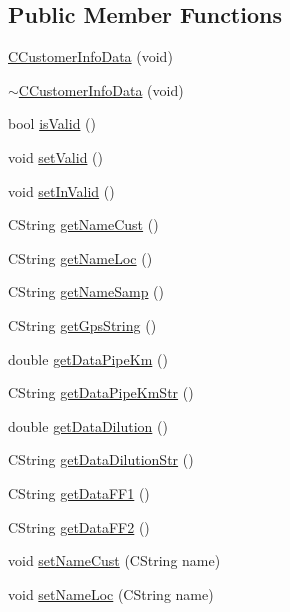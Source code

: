 \subsection*{Public Member Functions}
\begin{DoxyCompactItemize}
\item 
\hyperlink{classCCustomerInfoData_ac08151a758a5d5c978ebe0c799b3088f}{CCustomerInfoData} (void)
\item 
\hyperlink{classCCustomerInfoData_afda9de2789940ecb037a2b20c1559357}{$\sim$CCustomerInfoData} (void)
\item 
bool \hyperlink{classCCustomerInfoData_ab82f0824c1205c8a9748ea770db19e79}{isValid} ()
\item 
void \hyperlink{classCCustomerInfoData_a5f8077003b38a3a7af8b87497ea90b31}{setValid} ()
\item 
void \hyperlink{classCCustomerInfoData_ac82001af9efef72e111d51185c6bc63b}{setInValid} ()
\item 
CString \hyperlink{classCCustomerInfoData_ad04996b9e521441b2c6cd39b93d728af}{getNameCust} ()
\item 
CString \hyperlink{classCCustomerInfoData_a4b16d09f168ef2846a62d4ad40a9d943}{getNameLoc} ()
\item 
CString \hyperlink{classCCustomerInfoData_a10dc4afaa8ee2535a4fe53745a5939d2}{getNameSamp} ()
\item 
CString \hyperlink{classCCustomerInfoData_a3a97f41f5d07af066c86a1801b437207}{getGpsString} ()
\item 
double \hyperlink{classCCustomerInfoData_a8dd7a1987e8b4d45b0b2032d5c6692c2}{getDataPipeKm} ()
\item 
CString \hyperlink{classCCustomerInfoData_aa53784e91fbb1fd1c0dcc3f19f48f113}{getDataPipeKmStr} ()
\item 
double \hyperlink{classCCustomerInfoData_a565cb620f8db8762e6ae181ba410ccc8}{getDataDilution} ()
\item 
CString \hyperlink{classCCustomerInfoData_a72e77ae79d914e8fcdc276d5d4ab3ba1}{getDataDilutionStr} ()
\item 
CString \hyperlink{classCCustomerInfoData_a8cf40c721f44d664720620785b6d3c18}{getDataFF1} ()
\item 
CString \hyperlink{classCCustomerInfoData_a84ae7ae042a3ff8117498b700f6812d7}{getDataFF2} ()
\item 
void \hyperlink{classCCustomerInfoData_a9b314ec3d93d3c3027730555f0050e27}{setNameCust} (CString name)
\item 
void \hyperlink{classCCustomerInfoData_a84aff422889f89d95819610e1c94ae5a}{setNameLoc} (CString name)

\end{DoxyCompactItemize}
